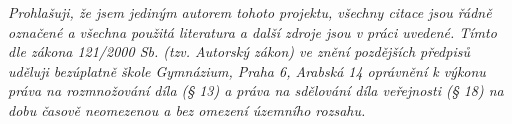 \textit{
	Prohlašuji, že jsem jediným autorem tohoto projektu, všechny citace jsou řádně označené a
	všechna použitá literatura a další zdroje jsou v práci uvedené. Tímto dle zákona 121/2000
	Sb. (tzv. Autorský zákon) ve znění pozdějších předpisů uděluji bezúplatně škole
	Gymnázium, Praha 6, Arabská 14 oprávnění k výkonu práva na rozmnožování díla (§ 13) a
	práva na sdělování díla veřejnosti (§ 18) na dobu časově neomezenou a bez omezení
	územního rozsahu.
}
